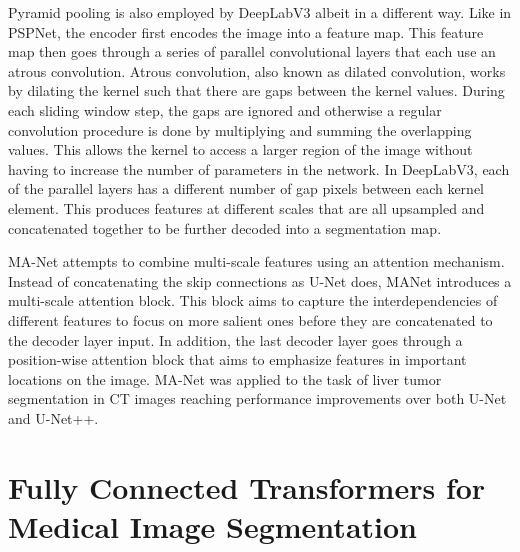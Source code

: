 Pyramid pooling is also employed by DeepLabV3 \cite{chen2017rethinking} albeit in a different way. Like in PSPNet, the encoder first encodes the image into a feature map. This feature map then goes through a series of parallel convolutional layers that each use an atrous convolution. Atrous convolution, also known as dilated convolution, works by dilating the kernel such that there are gaps between the kernel values. During each sliding window step, the gaps are ignored and otherwise a regular convolution procedure is done by multiplying and summing the overlapping values. This allows the kernel to access a larger region of the image without having to increase the number of parameters in the network. In DeepLabV3, each of the parallel layers has a different number of gap pixels between each kernel element. This produces features at different scales that are all upsampled and concatenated together to be further decoded into a segmentation map.

MA-Net \cite{manet} attempts to combine multi-scale features using an attention mechanism. Instead of concatenating the skip connections as U-Net does, MANet introduces a multi-scale attention block. This block aims to capture the interdependencies of different features to focus on more salient ones before they are concatenated to the decoder layer input. In addition, the last decoder layer goes through a position-wise attention block that aims to emphasize features in important locations on the image. MA-Net was applied to the task of liver tumor segmentation in CT images reaching performance improvements over both U-Net and U-Net++.

\section{Fully Connected Transformers for Medical Image Segmentation}










